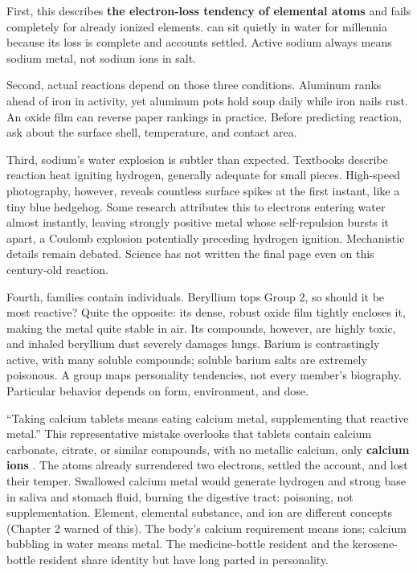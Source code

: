First, this describes \textbf{the electron-loss tendency of elemental atoms} and fails completely for already ionized elements.  can sit quietly in water for millennia because its loss is complete and accounts settled. Active sodium always means sodium metal, not sodium ions in salt.

Second, actual reactions depend on those three conditions. Aluminum ranks ahead of iron in activity, yet aluminum pots hold soup daily while iron nails rust. An oxide film can reverse paper rankings in practice. Before predicting reaction, ask about the surface shell, temperature, and contact area.

Third, sodium's water explosion is subtler than expected. Textbooks describe reaction heat igniting hydrogen, generally adequate for small pieces. High-speed photography, however, reveals countless surface spikes at the first instant, like a tiny blue hedgehog. Some research attributes this to electrons entering water almost instantly, leaving strongly positive metal whose self-repulsion bursts it apart, a Coulomb explosion potentially preceding hydrogen ignition. Mechanistic details remain debated. Science has not written the final page even on this century-old reaction.

Fourth, families contain individuals. Beryllium tops Group 2, so should it be most reactive? Quite the opposite: its dense, robust oxide film tightly encloses it, making the metal quite stable in air. Its compounds, however, are highly toxic, and inhaled beryllium dust severely damages lungs. Barium is contrastingly active, with many soluble compounds; soluble barium salts are extremely poisonous. A group maps personality tendencies, not every member's biography. Particular behavior depends on form, environment, and dose.

\begin{wuqu}
``Taking calcium tablets means eating calcium metal, supplementing that reactive metal.'' This representative mistake overlooks that tablets contain calcium carbonate, citrate, or similar compounds, with no metallic calcium, only \textbf{calcium ions} . The atoms already surrendered two electrons, settled the account, and lost their temper. Swallowed calcium metal would generate hydrogen and strong base in saliva and stomach fluid, burning the digestive tract: poisoning, not supplementation. Element, elemental substance, and ion are different concepts (Chapter 2 warned of this). The body's calcium requirement means ions; calcium bubbling in water means metal. The medicine-bottle resident and the kerosene-bottle resident share identity but have long parted in personality.
\end{wuqu}

